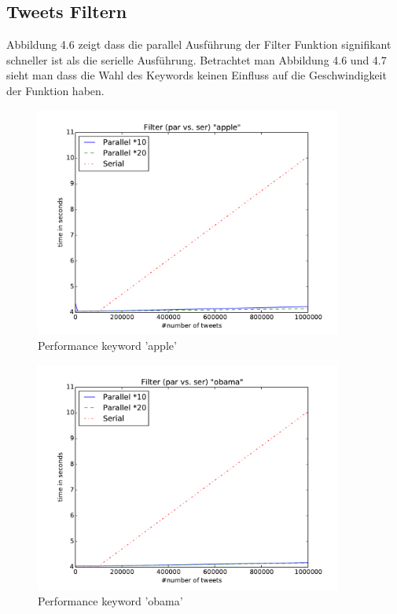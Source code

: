 \documentclass[12pt, oneside]{report}   	%
\begin{document}
\subsection{Tweets Filtern}
Abbildung 4.6  zeigt dass die parallel Ausführung der Filter Funktion signifikant schneller ist als die serielle Ausführung. Betrachtet man Abbildung 4.6 und 4.7 sieht man dass die Wahl des Keywords keinen Einfluss auf die Geschwindigkeit der Funktion haben.
\begin{figure}[htbp]
\begin{center}
\includegraphics[width=0.9\textwidth]{bilder/time_filter_apple.pdf}
\caption{Performance keyword 'apple'}
\label{img:performancefilter1}
\end{center}
\end{figure}

\begin{figure}[htbp]
\begin{center}
\includegraphics[width=0.9\textwidth]{bilder/time_filter_obama.pdf}
\caption{Performance keyword 'obama'}
\label{img:performancefilter3}
\end{center}
\end{figure}
\end{document}
